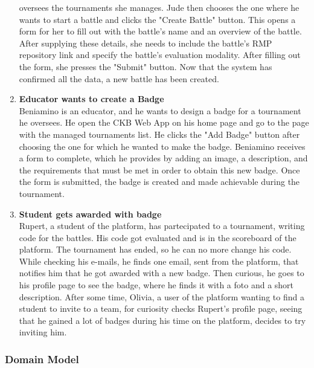 \begin{enumerate}[label= \textbf{SC\arabic*}]
    oversees the tournaments she manages. Jude then chooses the one where he wants to start a battle and clicks the "Create Battle" button. This opens a form for her to fill out with the battle's name and an overview of the battle. 
    After supplying these details, she needs to include the battle's RMP repository link and specify the battle's evaluation modality. After filling out the form, she presses the "Submit" button. Now that the system has confirmed all 
    the data, a new battle has been created.
    \item \textbf{Educator wants to create a Badge} \label{sc:sc12} \\Beniamino is an educator, and he wants to design a badge for a tournament he oversees. He open the CKB Web App on his home page and go to the page with the managed tournaments list.
    He clicks the "Add Badge" button after choosing the one for which he wanted to make the badge. Beniamino receives a form to complete, which he provides by adding an image, a description, and the requirements that must be met in order 
    to obtain this new badge. Once the form is submitted, the badge is created and made achievable during the tournament.
    \item \textbf{Student gets awarded with badge} \label{sc:sc13} \\
    Rupert, a student of the platform, has partecipated to a tournament, writing code for the battles. His code got evaluated and is in the scoreboard of the platform. The tournament has ended, so he can no more change his code. 
    While checking his e-mails, he finds one email, sent from the platform, that notifies him that he got awarded with a new badge.
    Then curious, he goes to his profile page to see the badge, where he finds it with a foto and a short description.
    After some time, Olivia, a user of the platform wanting to find a student to invite to a team, for curiosity checks Rupert's profile page, seeing that he gained a lot of badges during his time on the platform, decides to try inviting him.
\end{enumerate}

\newpage

\subsubsection{Domain Model}

